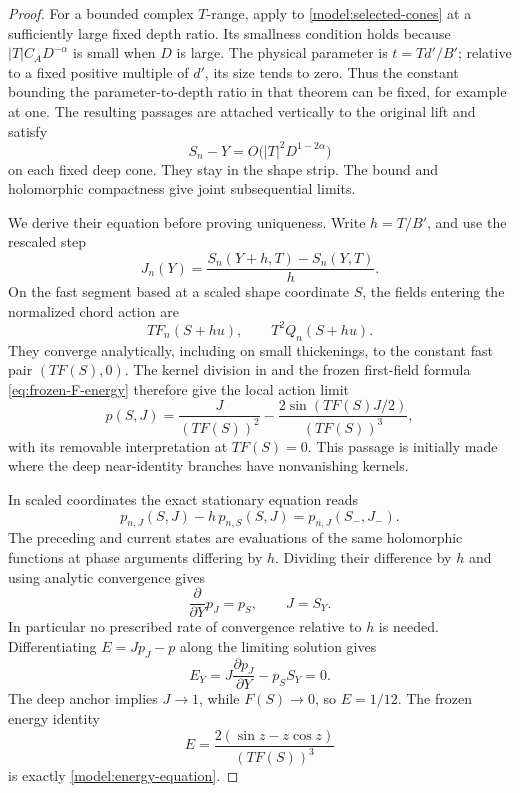 \begin{proof}
For a bounded complex \(T\)-range, apply  to
\eqref{model:selected-cones} at a sufficiently large fixed depth
ratio.  Its smallness condition holds because
\(|T|C_AD^{-\alpha}\) is small when \(D\) is large.  The physical
parameter is \(t=Td'/B'\); relative to a fixed positive multiple
of \(d'\), its size tends to zero.  Thus the constant bounding the
parameter-to-depth ratio in that theorem can be fixed, for example
at one.  The resulting passages are attached vertically to the
original lift and satisfy
\[
 S_n-Y=O\bigl(|T|^2D^{1-2\alpha}\bigr)
\]
on each fixed deep cone.  They stay in the shape strip.  The bound
and holomorphic compactness give joint subsequential limits.

We derive their equation before proving uniqueness.  Write
\(h=T/B'\), and use the rescaled step
\[
 J_n(Y)=\frac{S_n(Y+h,T)-S_n(Y,T)}h.
\]
On the fast segment based at a scaled shape coordinate \(S\), the
fields entering the normalized chord action are
\[
 T F_n(S+hu),\qquad T^2Q_n(S+hu).
\]
They converge analytically, including on small thickenings, to the
constant fast pair \((TF(S),0)\).  The kernel division in
 and the frozen first-field formula
\eqref{eq:frozen-F-energy} therefore give the local action limit
\[
 p(S,J)=\frac{J}{(TF(S))^2}
       -\frac{2\sin(TF(S)J/2)}{(TF(S))^3},
\]
with its removable interpretation at \(TF(S)=0\).
This passage is initially made where the deep near-identity
branches have nonvanishing kernels.

In scaled coordinates the exact stationary equation reads
\[
 p_{n,J}(S,J)-h\,p_{n,S}(S,J)
       =p_{n,J}(S_-,J_-).
\]
The preceding and current states are evaluations of the same
holomorphic functions at phase arguments differing by \(h\).
Dividing their difference by \(h\) and using analytic convergence
gives
\[
 \frac{\partial}{\partial Y}p_J=p_S,\qquad J=S_Y.
\]
In particular no prescribed rate of convergence relative to \(h\)
is needed.  Differentiating \(E=Jp_J-p\) along the limiting
solution gives
\[
 E_Y=J\frac{\partial p_J}{\partial Y}-p_SS_Y=0.
\]
The deep anchor implies \(J\to1\), while \(F(S)\to0\), so
\(E=1/12\).  The frozen energy identity
\[
 E=\frac{2(\sin z-z\cos z)}{(TF(S))^3}
\]
is exactly \eqref{model:energy-equation}.


\end{proof}
